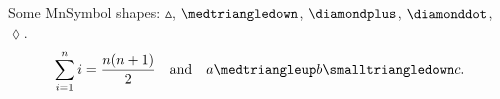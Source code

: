 \documentclass{article}
\begin{document}
Some MnSymbol shapes: $\smalltriangleup$, $\medtriangledown$,
$\diamondplus$, $\diamonddot$, $\lozenge$.
\[ \sum_{i=1}^{n} i = \frac{n(n+1)}{2} \quad\text{and}\quad
  a \medtriangleup b \smalltriangledown c. \]
\end{document}
